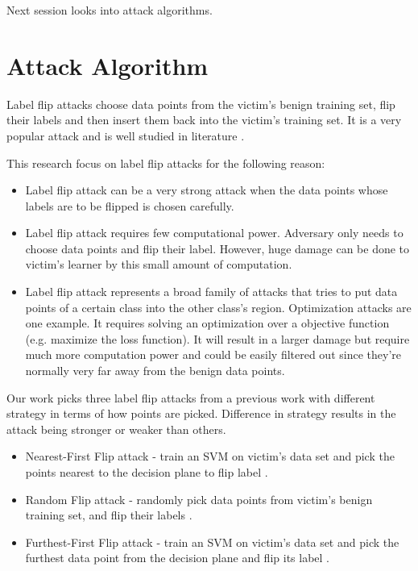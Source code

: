 \documentclass[10pt,conference,compsocconf,letterpaper]{IEEEtran}
\begin{document}
Next session looks into attack algorithms.


\section{Attack Algorithm}

Label flip attacks choose data points from the victim's benign training set, flip their labels and then insert them back into the victim's training set. It is a very popular attack and is well studied in literature \cite{xiao12}. 

This research focus on label flip attacks for the following reason:

\begin{itemize}
\item Label flip attack can be a very strong attack when the data points whose labels are to be flipped is chosen carefully.
\item Label flip attack requires few computational power. Adversary only needs to choose data points and flip their label. However, huge damage can be done to victim's learner by this small amount of computation. 
\item Label flip attack represents a broad family of attacks that tries to put data points of a certain class into the other class's region. Optimization attacks are one example. It requires solving an optimization over a objective function (e.g. maximize the loss function). It will result in a larger damage but require much more computation power and could be easily filtered out since they're normally very far away from the benign data points.
\end{itemize}

Our work picks three label flip attacks from a previous work with different strategy in terms of how points are picked. Difference in strategy results in the attack being stronger or weaker than others.

\begin{itemize}
\item Nearest-First Flip attack - train an SVM on victim's data set and pick the points nearest to the decision plane to flip label \cite{xiao12}.
\item Random Flip attack - randomly pick data points from victim's benign training set, and flip their labels \cite{xiao12}.
\item Furthest-First Flip attack - train an SVM on victim's data set and pick the furthest data point from the decision plane and flip its label \cite{xiao12}.
\end{itemize}
\end{document}
